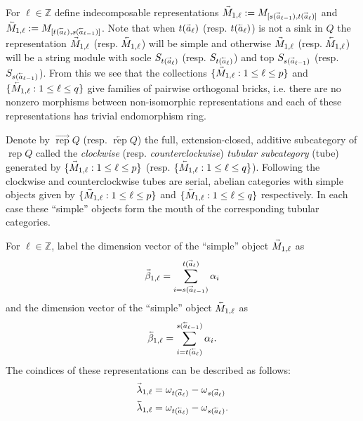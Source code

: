 \documentclass[12pt]{amsart}
\newcommand{\ZZ}{\mathbb{Z}}
\newcommand{\rep}{\operatorname{rep}}
\renewcommand{\vec}[1]{\accentset{\shortrightarrow}{#1}}
\newcommand{\cev}[1]{\accentset{\shortleftarrow}{#1}}
\numberwithin{equation}{section}
\begin{document}
  For $\ell\in\ZZ$ define indecomposable representations $\vec{M}_{1,\ell}:=M_{[s(\vec{a}_{\ell-1}),t(\vec{a}_\ell)]}$ and $\cev{M}_{1,\ell}:=M_{[t(\cev{a}_\ell),s(\cev{a}_{\ell-1})]}$.  Note that when $t(\vec{a}_\ell)$ (resp. $t(\cev{a}_\ell)$) is not a sink in $Q$ the representation $\vec{M}_{1,\ell}$ (resp. $\cev{M}_{1,\ell}$) will be simple and otherwise $\vec{M}_{1,\ell}$ (resp. $\cev{M}_{1,\ell}$) will be a string module with socle $S_{t(\vec{a}_\ell)}$ (resp. $S_{t(\cev{a}_\ell)}$) and top $S_{s(\vec{a}_{\ell-1})}$ (resp. $S_{s(\cev{a}_{\ell-1})}$).  From this we see that the collections $\{\vec{M}_{1,\ell}:1\le\ell\le p\}$ and $\{\cev{M}_{1,\ell}:1\le\ell\le q\}$ give families of pairwise orthogonal bricks, i.e. there are no nonzero morphisms between non-isomorphic representations and each of these representations has trivial endomorphism ring.

  Denote by $\overrightarrow{\rep}Q$ (resp. $\overleftarrow{\rep}Q$) the full, extension-closed, additive subcategory of $\rep Q$ called the \emph{clockwise} (resp. \emph{counterclockwise}) \emph{tubular subcategory} (tube) generated by $\{\vec{M}_{1,\ell}:1\le\ell\le p\}$ (resp. $\{\cev{M}_{1,\ell}:1\le\ell\le q\}$).  Following \cite[Section 3.1]{Rin84} the clockwise and counterclockwise tubes are serial, abelian categories with simple objects given by $\{\vec{M}_{1,\ell}:1\le\ell\le p\}$ and $\{\cev{M}_{1,\ell}:1\le\ell\le q\}$ respectively.  In each case these ``simple'' objects form the mouth of the corresponding tubular categories.

  For $\ell\in\ZZ$, label the dimension vector of the ``simple'' object $\vec{M}_{1,\ell}$ as
  \begin{equation}
    \vec{\beta}_{1,\ell}=\sum_{i=s(\vec{a}_{\ell-1})}^{t(\vec{a}_\ell)}\alpha_i
  \end{equation}
  and the dimension vector of the ``simple'' object $\cev{M}_{1,\ell}$ as
  \begin{equation}
    \cev{\beta}_{1,\ell}=\sum_{i=t(\cev{a}_\ell)}^{s(\cev{a}_{\ell-1})}\alpha_i.
  \end{equation}
  The coindices of these representations can be described as follows:
  \begin{align}
    \vec{\lambda}_{1,\ell}&=\omega_{t(\vec{a}_\ell)}-\omega_{s(\vec{a}_\ell)}\\
    \cev{\lambda}_{1,\ell}&=\omega_{t(\cev{a}_\ell)}-\omega_{s(\cev{a}_\ell)}.
  \end{align}
\end{document}
